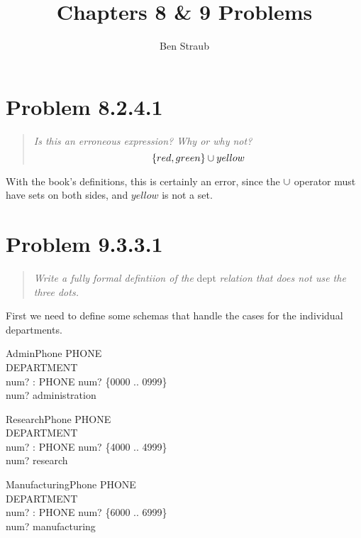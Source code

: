 \documentclass[10pt]{article}
\begin{document}
\title{Chapters 8 \& 9 Problems}
\author{Ben Straub}
\maketitle


\section{Problem 8.2.4.1}
\begin{quote}
  {\it
    Is this an erroneous expression?  Why or why not?
    \[ \{red, green\} \cup yellow \]
  }
\end{quote}
With the book's definitions, this is certainly an error, since the $\cup$ operator must have sets
on both sides, and $yellow$ is not a set.



\section{Problem 9.3.3.1}
\begin{quote}
  {\it Write a fully formal defintiion of the} dept {\it relation that does not use the three dots.}
\end{quote}

First we need to define some schemas that handle the cases for the individual departments.

\begin{schema}{AdminPhone}
  PHONE \\
  DEPARTMENT \\
  num?  : PHONE 
  \where
  num?  \in \{0000 ..  0999\} \\
  num?  \mapsto administration
\end{schema}

\begin{schema}{ResearchPhone}
  PHONE \\
  DEPARTMENT \\
  num?  : PHONE 
  \where
  num?  \in \{4000 ..  4999\} \\
  num?  \mapsto research
\end{schema}

\begin{schema}{ManufacturingPhone}
  PHONE \\
  DEPARTMENT \\
  num?  : PHONE 
  \where
  num?  \in \{6000 ..  6999\} \\
  num?  \mapsto manufacturing
\end{schema}
\end{document}

